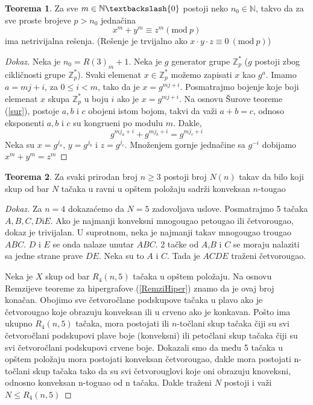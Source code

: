 \documentclass{article}
\theoremstyle{definition}
\newtheorem{teorema}{Teorema}[section]
\newcommand{\dokaz}[1]{\begin{proof}[Dokaz]#1\end{proof}}
\begin{document}
	\begin{teorema} \label{sur2}
		Za sve $m \in \mathbb{N} \textbackslash \{0\}$ postoji neko $n_{0} \in \mathbb{N}$, takvo da za sve proste brojeve $p>n_{0}$ jednačina
		\[
		x^{m}+y^{m}\equiv z^{m} (\mathrm{mod} \: p) 
		\]
		ima netrivijalna rešenja. (Rešenje je trvijalno ako $x\cdot y \cdot z\equiv 0\: (\mathrm{mod} \: p)$)
	\end{teorema}
	\dokaz{
		Neka je $n_0=R(3)_m+1$. Neka je $g$ generator grupe $\mathbb{Z}_{p}^{*} $ ($g$ postoji zbog cikličnosti grupe $\mathbb{Z}_{p}^{*}$). Svaki elemenat $x\in\mathbb{Z}_{p}^{*}$ možemo zapisati $x$ kao $g^a$. Imamo $a=mj+i$, za $0\leq i < m$, tako da je $x=g^{mj+i}$. Posmatrajmo bojenje koje boji elemenat $x$ skupa $\mathbb{Z}_{p}^{*}$ u boju $i$ ako je $x=g^{mj+i}$. Na osnovu Šurove teoreme (\ref{sur}), postoje $a, b$ i $c$ obojeni istom bojom, takvi da važi $a+b=c$, odnoso eksponenti $a, b$ i $c$ su kongrueni po modulu $m$. Dakle,
		\[
		g^{mj_{a}+i}+g^{mj_{b}+i}=g^{mj_{c}+i}
		\]
		Neka su $x=g^{j_{a}}$, $y=g^{j_{b}}$ i $z=g^{j_{c}}$. Množenjem gornje jednačine sa $g^{-i}$ dobijamo $x^m+y^m=z^m$  
	}
	\begin{teorema}
		Za svaki prirodan broj $n\geq 3$ postoji broj $N(n)$ takav da bilo koji skup od bar $N$ tačaka u ravni u opštem položaju sadrži konveksan $n$-tougao
	\end{teorema}
	\dokaz{
		Za $n=4$ dokazaćemo da $N=5$ zadovoljava uslove. Posmatrajmo 5 tačaka $A,B,C,D \mathrm{i} E$. Ako je najmanji konveksni mnogougao petougao ili četvorougao, dokaz je trivijalan. U suprotnom, neka je najmanji takav mnogougao trougao $ABC$. $D$ i $E$ se onda nalaze unutar $ABC$. 2 tačke od $A$,$B$ i $C$ se moraju nalaziti sa jedne strane prave $DE$. Neka su to $A$ i $C$. Tada je $ACDE$ traženi četvorougao.
		
		Neka je $X$ skup od bar $R_4(n,5)$ tačaka u opštem položaju. Na osnovu Remzijeve teoreme za hipergrafove (\ref{RemziHiper}) znamo da je ovaj broj konačan. Obojimo sve četvoročlane podskupove tačaka u plavo ako je četvorougao koje obrazuju konveksan ili u crveno ako je konkavan. Pošto ima ukupno $R_{4}(n,5)$ tačaka, mora postojati ili $n$-točlani skup tačaka čiji su svi četvoročlani podskupovi plave boje (konveksni) ili petočlani skup tačaka čiji su svi četvoročlani podskupovi crvene boje. Dokazali smo da među 5 tačaka u opštem položaju mora postojati konveksan četvorougao, dakle mora postojati n-točlani skup tačaka tako da su svi četvorouglovi koje oni obrazuju knoveksni, odnosno konveksan n-toguao od n tačaka. Dakle traženi $N$ postoji i važi $N\leq R_{4}(n,5)$
		
	}
	
\end{document}
